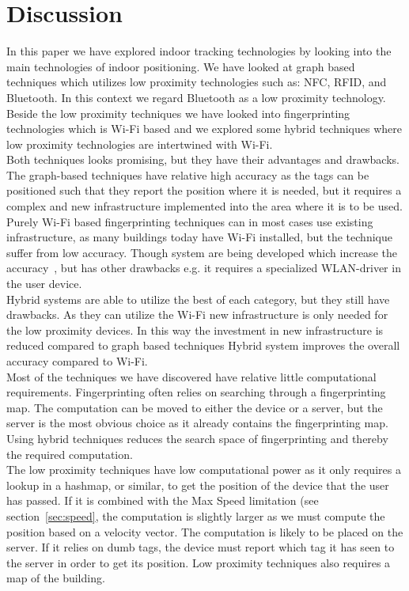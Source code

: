 \section{Discussion}
In this paper we have explored indoor tracking technologies by looking into the main technologies of indoor positioning. 
We have looked at graph based techniques which utilizes low proximity technologies such as: NFC, RFID, and Bluetooth. 
In this context we regard Bluetooth as a low proximity technology. 
Beside the low proximity techniques we have looked into fingerprinting technologies which is Wi-Fi based and we explored some hybrid techniques where low proximity technologies are intertwined with Wi-Fi. \\

Both techniques looks promising, but they have their advantages and drawbacks. 
The graph-based techniques have relative high accuracy as the tags can be positioned such that they report the position where it is needed, but it requires a complex and new infrastructure implemented into the area where it is to be used. \\

Purely Wi-Fi based fingerprinting techniques can in most cases use existing infrastructure, as many buildings today  have Wi-Fi installed, but the technique suffer from low accuracy.
Though system are being developed which increase the accuracy~\cite{Youssef2005}, but has other drawbacks e.g. it requires a specialized WLAN-driver in the user device. \\

Hybrid systems are able to utilize the best of each category, but they still have drawbacks. 
As they can utilize the Wi-Fi new infrastructure is only needed for the low proximity devices.
In this way the investment in new infrastructure is reduced compared to graph based techniques
Hybrid system improves the overall accuracy compared to Wi-Fi. \\

Most of the techniques we have discovered have relative little computational requirements. 
Fingerprinting often relies on searching through a fingerprinting map. 
The computation can be moved to either the device or a server, but the server is the most obvious choice as it already contains the fingerprinting map. 
Using hybrid techniques reduces the search space of fingerprinting and thereby the required computation. \\

The low proximity techniques have low computational power as it only requires a lookup in a hashmap, or similar, to get the position of the device that the user has passed. 
If it is combined with the Max Speed limitation (see section~\ref{sec:speed}, the computation is slightly larger as we must compute the position based on a velocity vector. 
The computation is likely to be placed on the server. 
If it relies on dumb tags, the device must report which tag it has seen to the server in order to get its position. 
Low proximity techniques also requires a map of the building.\\

